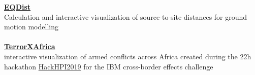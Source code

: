 \documentclass{article}
\newcommand{\spacingWork}{0.25cm}
\begin{document}
\begin{minipage}[t]{0.69\textwidth}
			\textbf{\large\color{pblue}\href{https://earthquake-distances.herokuapp.com}{EQDist}}\\
		{Calculation and interactive visualization of source-to-site distances for ground motion modelling}\\\\
%		
%		
%		
%		
			\textbf{\large\color{pblue}\href{https://terrorxafrica.herokuapp.com}{TerrorXAfrica}}\\
		{interactive visualization of armed conflicts across Africa created during the 22h hackathon \href{https://hackhpi2019.devpost.com}{\color{pblue}HackHPI2019} for the IBM cross-border effects challenge}
\end{minipage}
\end{document}
